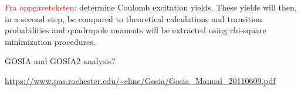 \documentclass[twoside,english]{uiofysmaster/uiofysmaster}
\begin{document}
\textcolor{red}{Fra oppgaveteksten:} \newline
determine Coulomb excitation yields. These yields will then, in a second step, be compared to theoretical calculations and transition probabilities and quadrupole moments will be extracted using chi-square minimization procedures.


GOSIA and GOSIA2 analysis?

\url{https://www.pas.rochester.edu/~cline/Gosia/Gosia_Manual_20110609.pdf}





\end{document}
